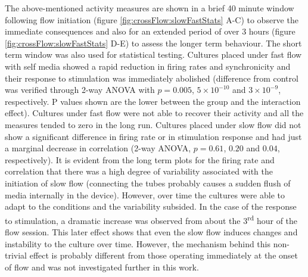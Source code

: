         The above-mentioned activity measures are shown in a brief 40 minute window following flow initiation (figure \ref{fig:crossFlow:slowFastStats} A-C) to observe the immediate consequences and also for an extended period of over 3 hours (figure \ref{fig:crossFlow:slowFastStats} D-E) to assess the longer term behaviour. The short term window was also used for statistical testing. Cultures placed under fast flow with self media showed a rapid reduction in firing rates and synchronicity and their response to stimulation was immediately abolished (difference from control was verified through 2-way ANOVA with \(p=0.005\), \(5\times 10^{-10}\) and \(3\times 10^{-9}\), respectively. P values shown are the lower between the group and the interaction effect). Cultures under fast flow were not able to recover their activity and all the measures tended to zero in the long run. Cultures placed under slow flow did not show a significant difference in firing rate or in stimulation response and had just a marginal decrease in correlation (2-way ANOVA, \(p=0.61\), \(0.20\) and \(0.04\), respectively). It is evident from the long term plots for the firing rate and correlation that there was a high degree of variability associated with the initiation of slow flow (connecting the tubes probably causes a sudden flush of media internally in the device). However, over time the cultures were able to adapt to the conditions and the variability subsided. In the case of the response to stimulation, a dramatic increase was observed from about the 3\textsuperscript{rd} hour of the flow session. This later effect shows that even the slow flow induces changes and instability to the culture over time. However, the mechanism behind this non-trivial effect is probably different from those operating immediately at the onset of flow and was not investigated further in this work.

